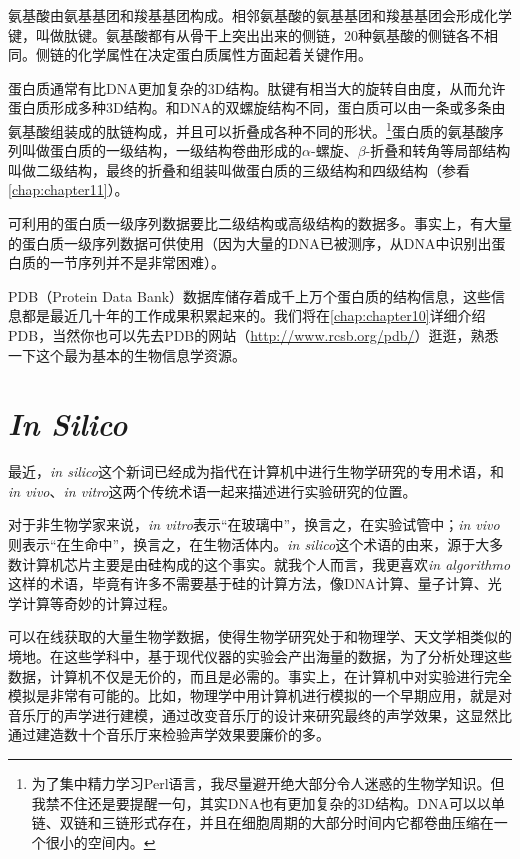 氨基酸由氨基基团和羧基基团构成。相邻氨基酸的氨基基团和羧基基团会形成化学键，叫做肽键。氨基酸都有从骨干上突出出来的侧链，20种氨基酸的侧链各不相同。侧链的化学属性在决定蛋白质属性方面起着关键作用。

蛋白质通常有比DNA更加复杂的3D结构。肽键有相当大的旋转自由度，从而允许蛋白质形成多种3D结构。和DNA的双螺旋结构不同，蛋白质可以由一条或多条由氨基酸组装成的肽链构成，并且可以折叠成各种不同的形状。\footnote{为了集中精力学习Perl语言，我尽量避开绝大部分令人迷惑的生物学知识。但我禁不住还是要提醒一句，其实DNA也有更加复杂的3D结构。DNA可以以单链、双链和三链形式存在，并且在细胞周期的大部分时间内它都卷曲压缩在一个很小的空间内。}蛋白质的氨基酸序列叫做蛋白质的一级结构，一级结构卷曲形成的$\alpha$-螺旋、$\beta$-折叠和转角等局部结构叫做二级结构，最终的折叠和组装叫做蛋白质的三级结构和四级结构（参看\autoref{chap:chapter11}）。

可利用的蛋白质一级序列数据要比二级结构或高级结构的数据多。事实上，有大量的蛋白质一级序列数据可供使用（因为大量的DNA已被测序，从DNA中识别出蛋白质的一节序列并不是非常困难）。

PDB（Protein Data
Bank）数据库储存着成千上万个蛋白质的结构信息，这些信息都是最近几十年的工作成果积累起来的。我们将在\autoref{chap:chapter10}详细介绍PDB，当然你也可以先去PDB的网站（\href{http://www.rcsb.org/pdb/}{http://www.rcsb.org/pdb/}）逛逛，熟悉一下这个最为基本的生物信息学资源。

\section{\textit{In Silico}}
  最近，\textit{in silico}这个新词已经成为指代在计算机中进行生物学研究的专用术语，和\textit{in vivo}、\textit{in vitro}这两个传统术语一起来描述进行实验研究的位置。

  对于非生物学家来说，\textit{in vitro}表示“在玻璃中”，换言之，在实验试管中；\textit{in vivo}则表示“在生命中”，换言之，在生物活体内。\textit{in silico}这个术语的由来，源于大多数计算机芯片主要是由硅构成的这个事实。就我个人而言，我更喜欢\textit{in algorithmo}这样的术语，毕竟有许多不需要基于硅的计算方法，像DNA计算、量子计算、光学计算等奇妙的计算过程。

可以在线获取的大量生物学数据，使得生物学研究处于和物理学、天文学相类似的境地。在这些学科中，基于现代仪器的实验会产出海量的数据，为了分析处理这些数据，计算机不仅是无价的，而且是必需的。事实上，在计算机中对实验进行完全模拟是非常有可能的。比如，物理学中用计算机进行模拟的一个早期应用，就是对音乐厅的声学进行建模，通过改变音乐厅的设计来研究最终的声学效果，这显然比通过建造数十个音乐厅来检验声学效果要廉价的多。

